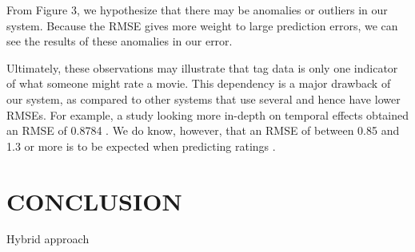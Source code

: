 \documentclass[letterpaper, 10 pt, conference]{ieeeconf}  %
\begin{document}
From Figure 3, we hypothesize that there may be anomalies or outliers in our system. Because the RMSE gives more weight to large prediction errors, we can see the results of these anomalies in our error.

Ultimately, these observations may illustrate that tag data is only one indicator of what someone might rate a movie. This dependency is a major drawback of our system, as compared to other systems that use several and hence have lower RMSEs. For example, a study looking more in-depth on temporal effects obtained an RMSE of 0.8784 \cite{netflix}. We do know, however, that an RMSE of between 0.85 and 1.3 or more is to be expected when predicting ratings \cite{netflix}.


\section{CONCLUSION}
Hybrid approach



\end{document}
